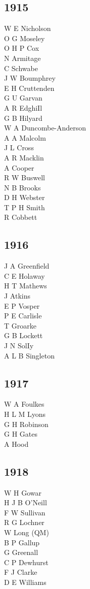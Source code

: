 \begin{multicols}{3}
  \subsection*{1915}
  W E Nicholson \\
  O G Moseley \\
  O H P Cox \\
  N Armitage \\
  C Schwabe \\
  J W Boumphrey \\
  E H Cruttenden \\
  G U Garvan \\
  A R EdghiIl \\
  G B Hilyard \\
  W A Duncombe-Anderson \\
  A A Malcolm \\
  J L Cross \\
  A R Macklin \\
  A Cooper \\
  R W Buswell \\
  N B Brooks \\
  D H Webster \\
  T P H Smith \\
  R Cobbett \\
  \subsection*{1916}
  J A Greenfield \\
  C E Holaway \\
  H T Mathews \\
  J Atkins \\
  E P Vosper \\
  P E Carlisle \\
  T Groarke \\
  G B Lockett \\
  J N SolIy \\
  A L B Singleton \\
  \subsection*{1917}
  W A Foulkes \\
  H L M Lyons \\
  G H Robinson \\
  G H Gates \\
  A Hood \\
  \subsection*{1918}
  W H Gowar \\
  H J B O'Neill \\
  F W Sullivan \\
  R G Lochner \\
  W Long (QM) \\
  B P Gallup \\
  G Greenall \\
  C P Dewhurst \\
  F J Clarke \\
  D E Williams \\

\end{multicols}
